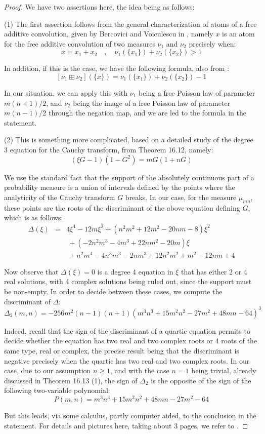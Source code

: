 \documentclass[12pt]{amsbook}
\begin{document}
\begin{proof}
We have two assertions here, the idea being as follows:

\medskip

(1) The first assertion follows from the general characterization of atoms of a free additive convolution, given by  Bercovici and Voiculescu in \cite{bvo}, namely $x$ is an atom for the free additive convolution of two measures $\nu_1$ and $\nu_2$ precisely when:
$$x=x_1+x_2\quad,\quad\nu_1(\{x_1\})+\nu_2(\{x_2\})>1$$

In addition, if this is the case, we have the following formula, also from \cite{bvo}:
$$[\nu_1\boxplus\nu_2](\{x\})=\nu_1(\{x_1\})+\nu_2(\{x_2\})-1$$

In our situation, we can apply this with $\nu_1$ being a free Poisson law of parameter $m(n+1)/2$, and $\nu_2$ being the image of a free Poisson law of parameter $m(n-1)/2$ through the negation map, and we are led to the formula in the statement.

\medskip

(2) This is something more complicated, based on a detailed study of the degree 3 equation  for the Cauchy transform, from Theorem 16.12, namely:
$$(\xi G-1)(1-G^2)=mG(1+nG)$$

We use the standard fact that the support of the absolutely continuous part of a probability measure is a union of intervals defined by the points where the analyticity of the Cauchy transform $G$ breaks. In our case, for the measure $\mu_{mn}$, these points are the roots of the discriminant of the above equation defining $G$, which is as follows:
\begin{eqnarray*}
\Delta(\xi)
&=&4\xi^4-12m\xi^3+(n^2m^2+12m^2-20nm-8)\xi^2\\
&&\ +(-2n^2m^3-4m^3+22nm^2-20m)\xi\\
&&\ +n^2m^4-4n^3m^3-2nm^3+12n^2m^2+m^2-12nm+4
\end{eqnarray*}

Now observe that $\Delta(\xi)=0$ is a degree 4 equation in $\xi$ that has either 2 or 4 real solutions, with 4 complex solutions being ruled out, since the support must be non-empty. In order to decide between these cases, we compute the discriminant of $\Delta$:
$$\Delta_2(m,n)=-256m^2(n-1)(n+1)\left(m^3n^3+15m^2n^2-27m^2+48mn-64\right)^3$$

Indeed, recall that the sign of the discriminant of a quartic equation permits to decide whether the equation has two real and two complex roots or 4 roots of the same type, real or complex, the precise result being that the discriminant is negative precisely when the quartic has two real and two complex roots. In our case, due to our assumption $n\geq1$, and with the case $n=1$ being trivial, already discussed in Theorem 16.13 (1), the sign of $\Delta_2$ is the opposite of the sign of the following two-variable polynomial: 
$$P(m,n) = m^3 n^3+15 m^2 n^2+48 m n-27 m^2-64$$

But this leads, via some calculus, partly computer aided, to the conclusion in the statement. For details and pictures here, taking about 3 pages, we refer to \cite{bn1}.
\end{proof}
\end{document}
